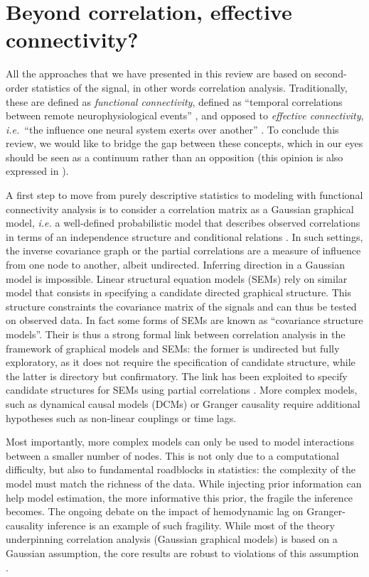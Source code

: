 \documentclass[5p]{elsarticle}
\begin{document}

\section{Beyond correlation, effective connectivity?}

All the approaches that we have presented in this review are based on
second-order statistics of the signal, in other words correlation
analysis. Traditionally, these are defined as \emph{functional
connectivity}, defined as ``temporal correlations between remote
neurophysiological events'' \cite{friston1994}, and opposed to
\emph{effective connectivity}, \emph{i.e.}\ ``the influence one neural
system exerts over another'' \cite{friston1994}. To conclude this review,
we would like to bridge the gap between these concepts, which in our eyes
should be seen as a continuum rather than an opposition (this opinion is
also expressed in \cite{mcintosh2010}).

A first step to move from purely descriptive statistics to modeling with
functional connectivity analysis is to consider a correlation matrix as a
Gaussian graphical model, \emph{i.e.} a well-defined probabilistic model
that describes observed correlations in terms of an independence
structure and conditional relations \cite{lauritzen1996,varoquaux2011}.
In such settings, the inverse covariance graph or the partial
correlations are a measure of influence from one node to another, albeit
undirected. Inferring direction in a Gaussian model is impossible. Linear
structural equation models (SEMs) \cite{mcintosh1994} rely on similar
model that consists in specifying a candidate directed graphical
structure. This structure constraints the covariance matrix of the
signals and can thus be tested on observed data. In fact some forms of
SEMs are known as ``covariance structure models''. Their is thus a strong
formal link between correlation analysis in the framework of graphical
models and SEMs: the former is undirected but fully exploratory, as it
does not require the specification of candidate structure, while the
latter is directory but confirmatory. The link has been exploited to
specify candidate structures for SEMs using partial correlations
\cite{marrelec2007}. More complex models, such as dynamical causal models
(DCMs) \cite{friston2003a} or Granger causality \cite{goebel2003} require
additional hypotheses such as non-linear couplings or time lags.

Most importantly, more complex models can only be used to model
interactions between a smaller number of nodes. This is not only due to a
computational difficulty, but also to fundamental roadblocks in
statistics: the complexity of the model must match the richness of the
data. While injecting prior information can help model estimation, the
more informative this prior, the fragile the inference becomes. The
ongoing debate on the impact of hemodynamic lag on Granger-causality
inference \cite{smith2012a} is an example of such fragility.
While most of the theory underpinning correlation analysis (Gaussian
graphical models) is based on a Gaussian assumption, the core results
are robust to violations of this assumption \cite{ravikumar2011}.
\end{document}
